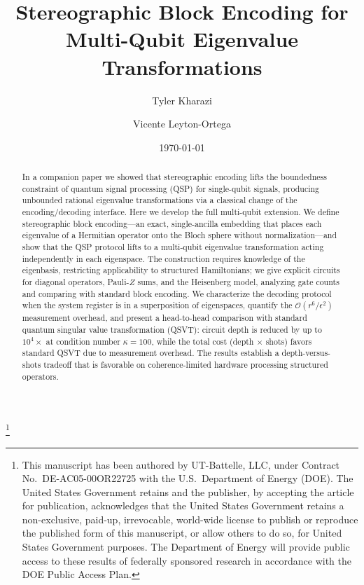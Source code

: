 \documentclass[
    reprint,
    amsmath,amssymb,
    aps,
    pra,  %
    superscriptaddress,
    floatfix
]{revtex4-2}
\theoremstyle{aps}
\begin{document}
\title{Stereographic Block Encoding for Multi-Qubit Eigenvalue Transformations}
\thanks{This manuscript has been authored by UT-Battelle, LLC, under Contract No.\ DE-AC05-00OR22725 with the U.S.\ Department of Energy (DOE). The United States Government retains and the publisher, by accepting the article for publication, acknowledges that the United States Government retains a non-exclusive, paid-up, irrevocable, world-wide license to publish or reproduce the published form of this manuscript, or allow others to do so, for United States Government purposes. The Department of Energy will provide public access to these results of federally sponsored research in accordance with the DOE Public Access Plan.}

\author{Tyler Kharazi}

\author{Vicente Leyton-Ortega}

\date{\today}

\begin{abstract}
	In a companion paper we showed that stereographic encoding
	lifts the boundedness constraint of quantum signal processing
	(QSP) for single-qubit signals, producing unbounded rational
	eigenvalue transformations via a classical change of the
	encoding/decoding interface.  Here we develop the full
	multi-qubit extension.  We define stereographic block
	encoding---an exact, single-ancilla embedding that places each
	eigenvalue of a Hermitian operator onto the Bloch sphere
	without normalization---and show that the QSP protocol lifts to
	a multi-qubit eigenvalue transformation acting independently in
	each eigenspace.  The construction requires knowledge of the
	eigenbasis, restricting applicability to structured
	Hamiltonians; we give explicit circuits for diagonal operators,
	Pauli-$Z$ sums, and the Heisenberg model, analyzing gate counts
	and comparing with standard block encoding.  We characterize
	the decoding protocol when the system register is in a
	superposition of eigenspaces, quantify the
	$\mathcal{O}(r^6/\epsilon^2)$ measurement overhead, and present
	a head-to-head comparison with standard quantum singular value
	transformation (QSVT): circuit depth is reduced by up to
	$10^4\times$ at condition number $\kappa = 100$, while the
	total cost (depth $\times$ shots) favors standard QSVT due to
	measurement overhead.  The results establish a
	depth-versus-shots tradeoff that is favorable on
	coherence-limited hardware processing structured operators.
\end{abstract}
\end{document}
